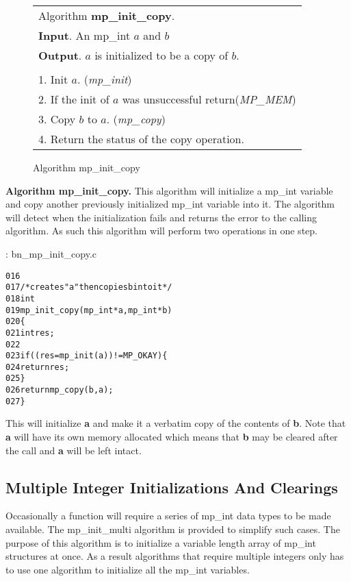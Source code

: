 \documentclass[b5paper]{book}
\begin{document}
\begin{figure}[here]
\begin{center}
\begin{tabular}{l}
\hline Algorithm \textbf{mp\_init\_copy}. \\
\textbf{Input}.   An mp\_int $a$ and $b$\\
\textbf{Output}.  $a$ is initialized to be a copy of $b$. \\
\hline \\
1.  Init $a$.  (\textit{mp\_init}) \\
2.  If the init of $a$ was unsuccessful return(\textit{MP\_MEM}) \\
3.  Copy $b$ to $a$.  (\textit{mp\_copy}) \\
4.  Return the status of the copy operation. \\
\hline
\end{tabular}
\end{center}
\caption{Algorithm mp\_init\_copy}
\end{figure}

\textbf{Algorithm mp\_init\_copy.}
This algorithm will initialize a mp\_int variable and copy another previously initialized mp\_int variable into it.  The algorithm will
detect when the initialization fails and returns the error to the calling algorithm.  As such this algorithm will perform two operations
in one step.  

\vspace{+3mm}\begin{small}
\hspace{-5.1mm}{\bf File}: bn\_mp\_init\_copy.c
\vspace{-3mm}
\begin{alltt}
016   
017   /* creates "a" then copies b into it */
018   int
019   mp_init_copy (mp_int * a, mp_int * b)
020   \{
021     int     res;
022   
023     if ((res = mp_init (a)) != MP_OKAY) \{
024       return res;
025     \}
026     return mp_copy (b, a);
027   \}
\end{alltt}
\end{small}

This will initialize \textbf{a} and make it a verbatim copy of the contents of \textbf{b}.  Note that 
\textbf{a} will have its own memory allocated which means that \textbf{b} may be cleared after the call
and \textbf{a} will be left intact.  

\subsection{Multiple Integer Initializations And Clearings}
Occasionally a function will require a series of mp\_int data types to be made available.  The mp\_init\_multi algorithm
is provided to simplify such cases.  The purpose of this algorithm is to initialize a variable length array of mp\_int 
structures at once.  As a result algorithms that require multiple integers only has to use 
one algorithm to initialize all the mp\_int variables.
\end{document}

